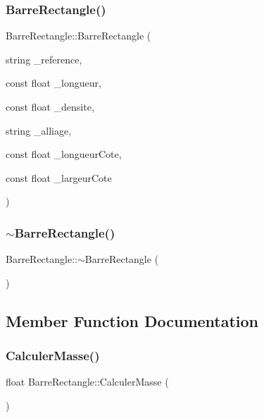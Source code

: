 \subsubsection{\texorpdfstring{Barre\+Rectangle()}{BarreRectangle()}}
{\footnotesize\ttfamily Barre\+Rectangle\+::\+Barre\+Rectangle (\begin{DoxyParamCaption}\item[{string}]{\+\_\+reference,  }\item[{const float}]{\+\_\+longueur,  }\item[{const float}]{\+\_\+densite,  }\item[{string}]{\+\_\+alliage,  }\item[{const float}]{\+\_\+longueur\+Cote,  }\item[{const float}]{\+\_\+largeur\+Cote }\end{DoxyParamCaption})}

\mbox{\label{class_barre_rectangle_aaf9fee36e7a6b914af9fc0bff25674e4}} 
\subsubsection{\texorpdfstring{$\sim$\+Barre\+Rectangle()}{~BarreRectangle()}}
{\footnotesize\ttfamily Barre\+Rectangle\+::$\sim$\+Barre\+Rectangle (\begin{DoxyParamCaption}{ }\end{DoxyParamCaption})}



\subsection{Member Function Documentation}
\mbox{\label{class_barre_rectangle_a9edb62e31a33790146eb0fd2b3fd7e4e}} 
\subsubsection{\texorpdfstring{Calculer\+Masse()}{CalculerMasse()}}
{\footnotesize\ttfamily float Barre\+Rectangle\+::\+Calculer\+Masse (\begin{DoxyParamCaption}{ }\end{DoxyParamCaption})}

